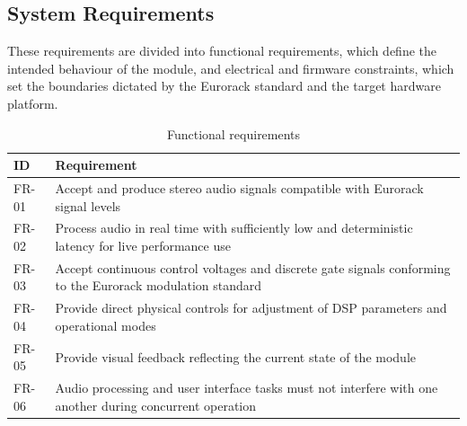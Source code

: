 \subsection{System Requirements}
\label{sec:system-requirements}

These requirements are divided into functional requirements, which define the intended behaviour of the module, and electrical and firmware constraints, which set the boundaries dictated by the Eurorack standard and the target hardware platform.

\begin{table}[ht]
	\centering
	\caption{Functional requirements}
	\label{tab:req-functional}
	\begin{tabularx}{\linewidth}{@{} l X @{}}
		\toprule
		\textbf{ID} & \textbf{Requirement} \\
		\midrule
		\label{req:FR-01}FR-01 & Accept and produce stereo audio signals compatible with Eurorack signal levels \\
		\label{req:FR-02}FR-02 & Process audio in real time with sufficiently low and deterministic latency for live performance use \\
		\label{req:FR-03}FR-03 & Accept continuous control voltages and discrete gate signals conforming to the Eurorack modulation standard \\
		\label{req:FR-04}FR-04 & Provide direct physical controls for adjustment of DSP parameters and operational modes \\
		\label{req:FR-05}FR-05 & Provide visual feedback reflecting the current state of the module \\
		\label{req:FR-06}FR-06 & Audio processing and user interface tasks must not interfere with one another during concurrent operation \\
		\bottomrule
	\end{tabularx}
\end{table}
